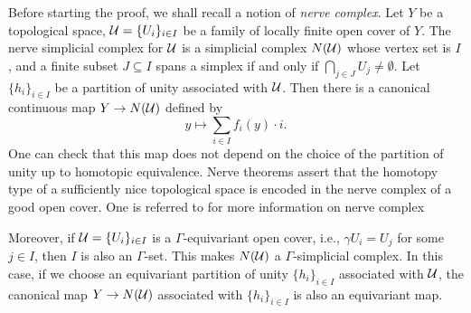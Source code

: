 \documentclass[11pt]{article}
\theoremstyle{definition}
\theoremstyle{plain}
\def\Ga{\Gamma}
\begin{document}
Before starting the proof, we shall recall a notion of \emph{nerve complex}. Let $Y$ be a topological space, $\mathcal U=\{U_i\}_{i\in I}$ be a family of locally finite open cover of $Y$. The nerve simplicial complex for $\mathcal U$ is a simplicial complex $N(\mathcal U)$ whose vertex set is $I$, and a finite subset $J\subseteq I$ spans a simplex if and only if $\bigcap_{j\in J}U_j\ne\emptyset$. Let $\{h_i\}_{i\in I}$ be a partition of unity associated with $\mathcal U$. Then there is a canonical continuous map $Y\to N(\mathcal U)$ defined by
$$y\mapsto\sum_{i\in I}f_i(y)\cdot i.$$
One can check that this map does not depend on the choice of the partition of unity up to homotopic equivalence. Nerve theorems assert that the homotopy type of a sufficiently nice topological space is encoded in the nerve complex of a good open cover. One is referred to \cite{Hatcher} for more information on nerve complex

Moreover, if $\mathcal U=\{U_i\}_{i\in I}$ is a $\Ga$-equivariant open cover, i.e., $\gamma U_i=U_j$ for some $j\in I$, then $I$ is also an $\Ga$-set. This makes $N(\mathcal U)$ a $\Ga$-simplicial complex. In this case, if we choose an equivariant partition of unity $\{h_i\}_{i\in I}$ associated with $\mathcal U$, the canonical map $Y\to N(\mathcal U)$ associated with $\{h_i\}_{i\in I}$ is also an equivariant map.
\end{document}
